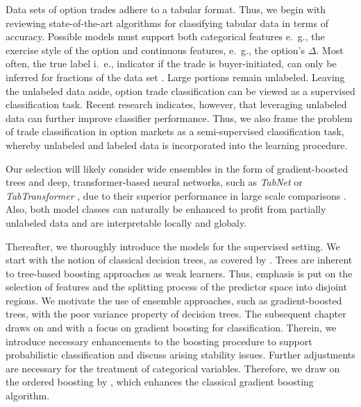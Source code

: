 Data sets of option trades adhere to a tabular format.  Thus, we begin with reviewing state-of-the-art algorithms for classifying tabular data in terms of accuracy. Possible models must support both categorical features e.~g., the exercise style of the option and continuous features, e.~g., the option's $\Delta$. Most often, the true label i.~e., indicator if the trade is buyer-initiated, can only be inferred for fractions of the data set \autocites{grauerOptionTradeClassification2022}{savickasInferringDirectionOption2003}. Large portions remain unlabeled. Leaving the unlabeled data aside, option trade classification can be viewed as a supervised classification task. Recent research \autocites{arikTabNetAttentiveInterpretable2020}{huangTabTransformerTabularData2020}{yoonVIMEExtendingSuccess2020} indicates, however, that leveraging unlabeled data can further improve classifier performance. Thus, we also frame the problem of trade classification in option markets as a semi-supervised classification task, whereby unlabeled and labeled data is incorporated into the learning procedure. 

Our selection will likely consider wide ensembles in the form of gradient-boosted trees and deep, transformer-based neural networks, such as \emph{TabNet} \autocite{arikTabNetAttentiveInterpretable2020} or \emph{TabTransformer} \autocite{huangTabTransformerTabularData2020}, due to their superior performance in large scale comparisons \autocites{borisovDeepNeuralNetworks2022}{gorishniyRevisitingDeepLearning2021}{grinsztajnWhyTreebasedModels2022}{shwartz-zivTabularDataDeep2021}. Also, both model classes can naturally be enhanced to profit from partially unlabeled data and are interpretable locally and globaly. 

Thereafter, we thoroughly introduce the models for the supervised setting. We start with the notion of classical decision trees, as covered by \textcite{breimanClassificationRegressionTrees2017}. Trees are inherent to tree-based boosting approaches as weak learners. Thus, emphasis is put on the selection of features and the splitting process of the predictor space into disjoint regions. We motivate the use of ensemble approaches, such as gradient-boosted trees, with the poor variance property of decision trees. The subsequent chapter draws on \textcite{hastietrevorElementsStatisticalLearning2009} and \textcite{friedmanGreedyFunctionApproximation2001} with a focus on gradient boosting for classification. Therein, we introduce necessary enhancements to the boosting procedure to support probabilistic classification and discuss arising stability issues. Further adjustments are necessary for the treatment of categorical variables. Therefore, we draw on the ordered boosting by \textcite{prokhorenkovaCatBoostUnbiasedBoosting2018}, which enhances the classical gradient boosting algorithm.

